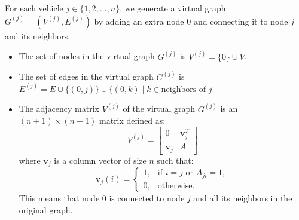 \documentclass[letterpaper, 10pt, conference]{ieeeconf}  %
\begin{document}
For each vehicle $j \in \{1, 2, \dots, n\}$, we generate a virtual graph $G^{(j)} = (V^{(j)}, E^{(j)})$ by adding an extra node $0$ and connecting it to node $j$ and its neighbors.

\begin{itemize}
    \item The set of nodes in the virtual graph $G^{(j)}$ is $V^{(j)} = \{0\} \cup V$.
    \item  The set of edges in the virtual graph $G^{(j)}$ is $E^{(j)} = E \cup \{(0, j)\} \cup \{(0, k) \mid k \in \text{neighbors of } j$
    \item The adjacency matrix $V^{(j)}$ of the virtual graph $G^{(j)}$ is an $(n+1) \times (n+1)$ matrix defined as:
    \begin{equation}
        V^{(j)} = \begin{bmatrix} 0 & \mathbf{v}_j^T \\ \mathbf{v}_j & A \end{bmatrix}
    \end{equation}
    where $\mathbf{v}_j$ is a column vector of size $n$ such that:
    \begin{equation}
        \mathbf{v}_j(i) = \begin{cases}
            1, & \text{if } i = j \text{ or } A_{ji} = 1, \\
            0, & \text{otherwise}.
        \end{cases}
    \end{equation}
    This means that node $0$ is connected to node $j$ and all its neighbors in the original graph.
\end{itemize}



\end{document}
